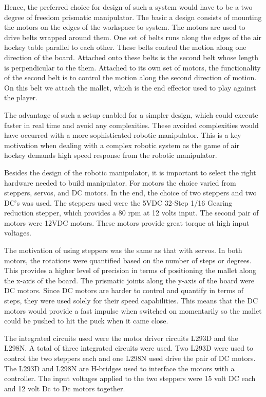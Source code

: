 \documentclass[letterpaper, 12 pt, conference]{ieeeconf}
\begin{document}
Hence, the preferred choice for design of such a system would have to be a two degree of freedom prismatic manipulator. The basic a design consists of mounting the motors on the edges of the workspace to system. The motors are used to drive belts wrapped around them. One set of belts runs along the edges of the air hockey table parallel to each other. These belts control the motion along one direction of the board. Attached onto these belts is the second belt whose length is perpendicular to the them. Attached to its own set of motors, the functionality of the second belt is to control the motion along the second direction of motion. On this belt we attach the mallet, which is the end effector used to play against the player.

The advantage of such a setup enabled for a simpler design, which could execute faster in real time and avoid any complexities. These avoided complexities would have occurred with a more sophisticated robotic manipulator. This is a key motivation when dealing with a complex robotic system as the game of air hockey demands high speed response from the robotic manipulator.

Besides the design of the robotic manipulator, it is important to select the right hardware needed to build manipulator. For motors the choice varied from steppers, servos, and DC motors. In the end, the choice of two steppers and two DC’s was used. The steppers used were the 5VDC 32-Step 1/16 Gearing reduction stepper, which provides a 80 rpm at 12 volts input. The second pair of motors were 12VDC motors. These motors provide great torque at high input voltages. 

The motivation of using steppers was the same as that with servos. In both motors, the rotations were quantified based on the number of steps or degrees. This provides a higher level of precision in terms of positioning the mallet along the x-axis of the board. The prismatic joints along the y-axis of the board were DC motors. Since DC motors are harder to control and quantify in terms of steps, they were used solely for their speed capabilities. This means that the DC motors would provide a fast impulse when switched on momentarily so the mallet could be pushed to hit the puck when it came close.

The integrated circuits used were the motor driver circuits L293D and the L298N. A total of three integrated circuits were used. Two L293D were used to control the two steppers each and one L298N used drive the pair of DC motors. The L293D and L298N are H-bridges used to interface the motors with a controller. The input voltages applied to the two steppers were 15 volt DC each and 12 volt Dc to Dc motors together. 
\end{document}
